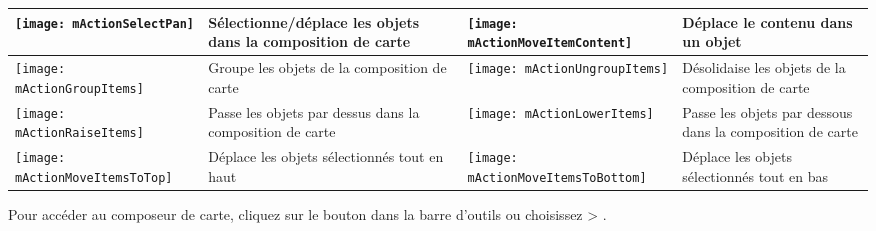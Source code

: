 {\begin{table}[h]
\begin{tabular}{|l|p{6.9cm}|l|p{6.9cm}|}
\hline \texttt{[image: mActionSelectPan]} & Sélectionne/déplace les
objets dans la composition de carte &
\texttt{[image: mActionMoveItemContent]} & Déplace le contenu dans
un objet \\
 \hline \texttt{[image: mActionGroupItems]} & Groupe les objets de
la composition de carte & 
 \texttt{[image: mActionUngroupItems]} & Désolidaise les objets de
la composition de carte \\
 \hline \texttt{[image: mActionRaiseItems]} & Passe les objets par
dessus dans la composition de carte &
\texttt{[image: mActionLowerItems]} & Passe les objets par dessous
dans la composition de carte \\
 \hline \texttt{[image: mActionMoveItemsToTop]} & Déplace les
objets sélectionnés tout en haut & 
 \texttt{[image: mActionMoveItemsToBottom]} & Déplace les
objets sélectionnés tout en bas \\
\hline
\end{tabular}
\end{table}

Pour accéder au composeur de carte, cliquez sur le bouton
 dans la barre d'outils ou choisissez
 > .

}
